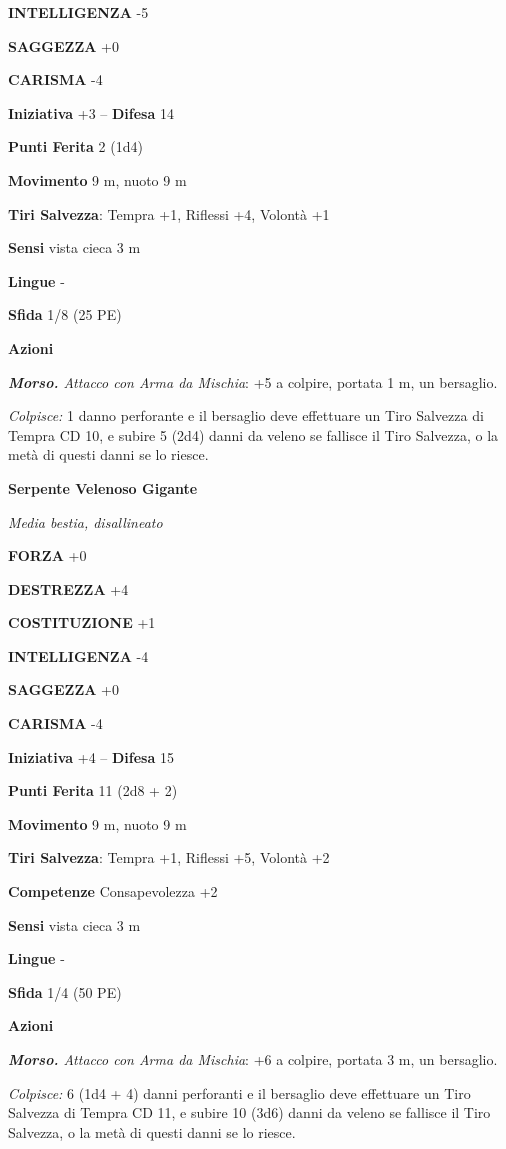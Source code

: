 \begin{multicols}{2}
\textbf{INTELLIGENZA} -5

\textbf{SAGGEZZA} +0

\textbf{CARISMA} -4

\textbf{Iniziativa} +3 -- \textbf{Difesa} 14

\textbf{Punti Ferita} 2 (1d4)

\textbf{Movimento} 9 m, nuoto 9 m

\textbf{Tiri Salvezza}: Tempra +1, Riflessi +4, Volontà +1

\textbf{Sensi} vista cieca 3 m

\textbf{Lingue} -

\textbf{Sfida} 1/8 (25 PE)

\textbf{Azioni}

\emph{\textbf{Morso.} Attacco con Arma da Mischia}: +5 a colpire, portata 1 m, un bersaglio.

\emph{Colpisce:} 1 danno perforante e il bersaglio deve effettuare un Tiro Salvezza di Tempra CD 10, e subire 5 (2d4) danni da veleno se fallisce il Tiro Salvezza, o la metà di questi danni se lo riesce.

\medskip\textbf{Serpente Velenoso Gigante}

\emph{Media bestia, disallineato}

\textbf{FORZA} +0

\textbf{DESTREZZA} +4

\textbf{COSTITUZIONE} +1

\textbf{INTELLIGENZA} -4

\textbf{SAGGEZZA} +0

\textbf{CARISMA} -4

\textbf{Iniziativa} +4 -- \textbf{Difesa} 15

\textbf{Punti Ferita} 11 (2d8 + 2)

\textbf{Movimento} 9 m, nuoto 9 m

\textbf{Tiri Salvezza}: Tempra +1, Riflessi +5, Volontà +2

\textbf{Competenze} Consapevolezza +2

\textbf{Sensi} vista cieca 3 m

\textbf{Lingue} -

\textbf{Sfida} 1/4 (50 PE)

\textbf{Azioni}

\emph{\textbf{Morso.} Attacco con Arma da Mischia}: +6 a colpire, portata 3 m, un bersaglio.

\emph{Colpisce:} 6 (1d4 + 4) danni perforanti e il bersaglio deve effettuare un Tiro Salvezza di Tempra CD 11, e subire 10 (3d6) danni da veleno se fallisce il Tiro Salvezza, o la metà di questi danni se lo riesce.


\end{multicols}
